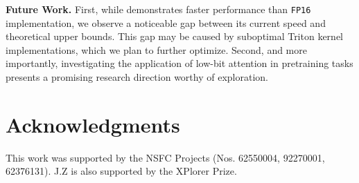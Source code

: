 \textbf{Future Work.} First, while \sageback demonstrates faster performance than \texttt{FP16} implementation, we observe a noticeable gap between its current speed and theoretical upper bounds. This gap may be caused by suboptimal Triton kernel implementations, which we plan to further optimize. Second, and more importantly, investigating the application of low-bit attention in pretraining tasks presents a promising research direction worthy of exploration.


\section*{Acknowledgments}
This work was supported by the NSFC Projects (Nos. 62550004, 92270001, 62376131). J.Z is also supported by the XPlorer Prize.
